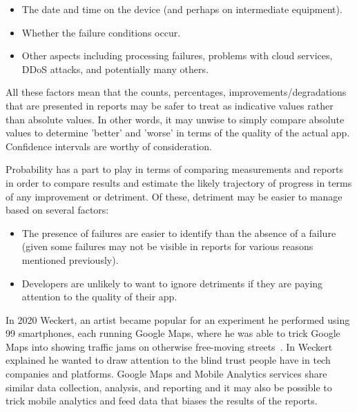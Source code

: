 \begin{itemize}
    \item The date and time on the device (and perhaps on intermediate equipment).
    \item Whether the failure conditions occur.
    \item Other aspects including processing failures, problems with cloud services, DDoS attacks, and potentially many others.
\end{itemize}

All these factors mean that the counts, percentages, improvements/degradations that are presented in reports may be safer to treat as indicative values rather than absolute values. In other words, it may unwise to simply compare absolute values to determine 'better' and 'worse' in terms of the quality of the actual app. Confidence intervals are worthy of consideration. 

Probability has a part to play in terms of comparing measurements and reports in order to compare results and estimate the likely trajectory of progress in terms of any improvement or detriment. Of these, detriment may be easier to manage based on several factors:

\begin{itemize}
    \item The presence of failures are easier to identify than the absence of a failure (given some failures may not be visible in reports for various reasons mentioned previously).
    \item Developers are unlikely to want to ignore detriments if they are paying attention to the quality of their app.
\end{itemize}

In 2020 Weckert, an artist became popular for an experiment he performed using 99 smartphones, each running Google Maps, where he was able to trick Google Maps into showing traffic jams on otherwise free-moving streets~. In  Weckert explained he wanted to draw attention to the blind trust people have in tech companies and platforms. Google Maps and Mobile Analytics services share similar data collection, analysis, and reporting and it may also be possible to trick mobile analytics and feed data that biases the results of the reports.

